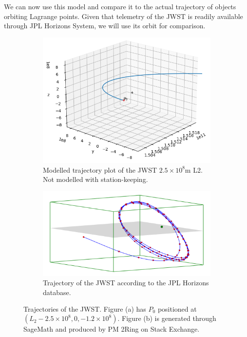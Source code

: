 We can now use this model and compare it to the actual trajectory of objects orbiting Lagrange points.
Given that telemetry of the JWST is readily available through JPL Horizons System, we will use its orbit for comparison.
\begin{figure}[H]
	\centering
	\captionsetup[subfigure]{justification=centering}
	\begin{subfigure}[b]{0.4\textwidth}
		\centering
		\includegraphics[scale=0.5]{3dplot3.png}
		\caption{Modelled trajectory plot of the JWST $2.5\times10^8\si{\metre}$ L2. Not modelled with station-keeping.}
		\label{fig:3dplot3}
	\end{subfigure}
	\qquad
	\begin{subfigure}[b]{0.4\textwidth}
		\centering
		\includegraphics[scale=0.2]{xyjwstplot.png}
		\vspace*{1em}
		\caption{Trajectory of the JWST according to the JPL Horizons database.}
		\label{fig:3dplot4}
		\vspace*{1em}
	\end{subfigure}
	\caption{Trajectories of the JWST. Figure (a) has $P_0$ positioned at $(L_2 - 2.5\times10^8, 0, - 1.2\times10^8)$. Figure (b) is generated through SageMath and produced by PM 2Ring on Stack Exchange.}
\end{figure}
